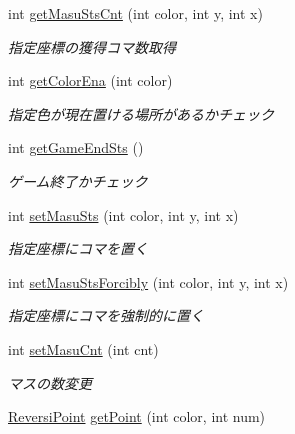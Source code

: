 \begin{DoxyCompactItemize}
int \hyperlink{classjp_1_1gr_1_1java__conf_1_1yuta__yoshinaga_1_1reversi_1_1model_1_1_reversi_a1a528710342faba65975f4768d24b129}{get\+Masu\+Sts\+Cnt} (int color, int y, int x)
\begin{DoxyCompactList}\small\item\em 指定座標の獲得コマ数取得 \end{DoxyCompactList}\item 
int \hyperlink{classjp_1_1gr_1_1java__conf_1_1yuta__yoshinaga_1_1reversi_1_1model_1_1_reversi_ac6fafa41eeff56abfc67b2b5876b50f9}{get\+Color\+Ena} (int color)
\begin{DoxyCompactList}\small\item\em 指定色が現在置ける場所があるかチェック \end{DoxyCompactList}\item 
int \hyperlink{classjp_1_1gr_1_1java__conf_1_1yuta__yoshinaga_1_1reversi_1_1model_1_1_reversi_abc97a3ba932ee271cf04ff0f72162100}{get\+Game\+End\+Sts} ()
\begin{DoxyCompactList}\small\item\em ゲーム終了かチェック \end{DoxyCompactList}\item 
int \hyperlink{classjp_1_1gr_1_1java__conf_1_1yuta__yoshinaga_1_1reversi_1_1model_1_1_reversi_a7abf9238b933653eec2908f6e1a863db}{set\+Masu\+Sts} (int color, int y, int x)
\begin{DoxyCompactList}\small\item\em 指定座標にコマを置く \end{DoxyCompactList}\item 
int \hyperlink{classjp_1_1gr_1_1java__conf_1_1yuta__yoshinaga_1_1reversi_1_1model_1_1_reversi_af2ba1c808c067c94106d04ccd5e25e3b}{set\+Masu\+Sts\+Forcibly} (int color, int y, int x)
\begin{DoxyCompactList}\small\item\em 指定座標にコマを強制的に置く \end{DoxyCompactList}\item 
int \hyperlink{classjp_1_1gr_1_1java__conf_1_1yuta__yoshinaga_1_1reversi_1_1model_1_1_reversi_a0e9bc15d570635cf024287fbf541b4b9}{set\+Masu\+Cnt} (int cnt)
\begin{DoxyCompactList}\small\item\em マスの数変更 \end{DoxyCompactList}\item 
\hyperlink{classjp_1_1gr_1_1java__conf_1_1yuta__yoshinaga_1_1reversi_1_1model_1_1_reversi_point}{Reversi\+Point} \hyperlink{classjp_1_1gr_1_1java__conf_1_1yuta__yoshinaga_1_1reversi_1_1model_1_1_reversi_ab180757b310c3a72cf159043ba0dc09e}{get\+Point} (int color, int num)

\end{DoxyCompactItemize}

